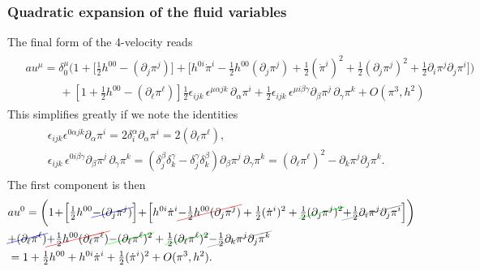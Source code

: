 \subsubsection{Quadratic expansion of the fluid variables}
The final form of the 4-velocity reads
{\small\begin{align}
\begin{aligned}
    &au^\mu=\delta_0^\mu \bigg(1 \!+\! \Big[\tfrac12 h^{00} -(\partial_j \pi^j)\Big]\! +\! \Big[ h^{0 i} \dot{\pi}^i -\tfrac12 h^{00} (\partial_j \pi^j) + \tfrac12 (\dot{\pi}^i)^2 + \tfrac12 (\partial_j \pi^j)^2 +\tfrac12 \partial_i\pi^j\partial_j\pi^i\Big]\bigg)
    \\
    &\quad\qquad+\left[1 + \tfrac12 h^{00}-(\partial_\ell\pi^\ell)\right]
     \tfrac12\epsilon_{i j k}\,\epsilon^{\mu \alpha j k}\,\partial_\alpha\pi^i 
     +\tfrac{1}{2} \epsilon_{ijk}\, \epsilon^{\mu i \beta\gamma}\partial_\beta\pi^j\,\partial_\gamma\pi^k
    + O(\pi^3, h^2)
\end{aligned}\end{align}}
This simplifies greatly if we note the identities
{\small\begin{align}\begin{aligned}
    &\epsilon_{ijk}\epsilon^{0\alpha jk}\partial_\alpha\pi^i=2\delta_i^\alpha\partial_\alpha\pi^i= 2(\partial_\ell\pi^\ell),\\[2pt]
    &\epsilon_{ijk}\, \epsilon^{0 i \beta\gamma}\partial_\beta\pi^j\,\partial_\gamma\pi^k = (\delta_j^\beta\delta_k^\gamma-\delta_j^\gamma\delta_k^\beta)\partial_\beta\pi^j\,\partial_\gamma\pi^k= (\partial_\ell\pi^\ell)^2- \partial_k\pi^j\partial_j\pi^k.
\end{aligned}
\end{align}}
The first component is then
{\small\begin{align}
\begin{aligned}
    &au^0=\bigg(1 \!+\! \Big[\tfrac12 h^{00} \bluecancel{-(\partial_j \pi^j)}\Big]\! +\! \Big[ h^{0 i} \dot{\pi}^i \redcancel{-\tfrac12 h^{00} (\partial_j \pi^j)} + \tfrac12 (\dot{\pi}^i)^2 + \greencancel{\tfrac12 (\partial_j \pi^j)^2}\graycancel{+\tfrac12 \partial_i\pi^j\partial_j\pi^i}\Big]\bigg) 
    \\
    &\bluecancel{+(\partial_\ell\pi^\ell)} \redcancel{+\tfrac12 h^{00} (\partial_\ell\pi^\ell)}\greencancel{-(\partial_\ell\pi^\ell)^2} + \greencancel{\tfrac12 (\partial_\ell\pi^\ell)^2} \graycancel{-\tfrac12 \partial_k\pi^j\partial_j\pi^k}
    \\
    &=1 + \tfrac12 h^{00} +h^{0i}\dot{\pi}^i+ \tfrac12 (\dot{\pi}^i)^2 + O(\pi^3, h^2).
\end{aligned}\end{align}}
